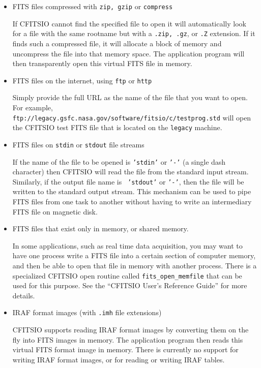 \documentclass[11pt]{article}
\begin{document}
\begin{itemize}
\item FITS files compressed with {\tt zip, gzip} or {\tt compress}

If CFITSIO cannot find the specified file to open it will automatically
look for a file with the same rootname but with a {\tt .zip, .gz}, or
{\tt .Z} extension.  If it finds such a compressed file, it will
allocate a block of memory and uncompress the file into that memory
space.  The application program will then transparently open this
virtual FITS file in memory.

\item  FITS files on the internet, using {\tt ftp} or {\tt http}

Simply provide the full URL as the name of the file that you want to open.  For example,\linebreak
{\tt ftp://legacy.gsfc.nasa.gov/software/fitsio/c/testprog.std}\linebreak
will open the CFITSIO test FITS file that is located on the {\tt legacy} machine.

\item  FITS files on {\tt stdin} or {\tt stdout} file streams

If the name of the file to be opened is {\tt 'stdin'} or {\tt '-'} (a
single dash character) then CFITSIO will read the file from the
standard input stream.  Similarly, if the output file name is {\tt
'stdout'} or {\tt '-'}, then the file will be written to the standard
output stream.  This mechanism can be used to pipe FITS files from one task
to another without having to write an intermediary FITS file on magnetic disk.

\item FITS files that exist only in memory, or shared memory.

In some applications, such as real time data acquisition, you may want
to have one process write a FITS file into a certain section of
computer memory, and then be able to open that file in memory with
another process.  There is a specialized CFITSIO open routine called
{\tt fits\_open\_memfile} that can be used for this purpose.  See the
``CFITSIO User's Reference Guide'' for more details.

\item  IRAF format images (with {\tt .imh} file extensions)

CFITSIO supports reading IRAF format images by converting them on the
fly into FITS images in memory.  The application program then reads
this virtual FITS format image in memory.  There is currently no
support for writing IRAF format images, or for reading or writing IRAF
tables.


\end{itemize}
\end{document}
